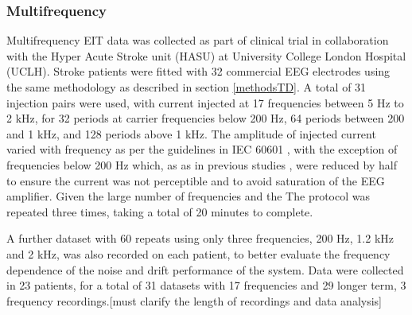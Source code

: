\subsubsection{Multifrequency}

Multifrequency EIT data was collected as part of clinical trial in collaboration with the Hyper Acute Stroke unit (HASU) at University College London Hospital (UCLH). Stroke patients were fitted with 32 commercial EEG electrodes using the same methodology as described in section \ref{methodsTD}. A total of 31 injection pairs were used, with current injected at 17 frequencies between 5 Hz to 2 kHz, for 32 periods at carrier frequencies below 200 Hz, 64 periods between 200 and 1 kHz, and 128 periods above 1 kHz. The amplitude of injected current varied with frequency as per the guidelines in IEC 60601 \cite{IEC}, with the exception of frequencies below 200 Hz which, as as in previous studies \cite{McEwan_2006}, were reduced by half to ensure the current was not perceptible and to avoid saturation of the EEG amplifier. Given the large number of frequencies and the The protocol was repeated three times, taking a total of 20 minutes to complete. 

A further dataset with 60 repeats using only three frequencies, 200 Hz, 1.2 kHz and 2 kHz, was also recorded on each patient, to better evaluate the frequency dependence of the noise and drift performance of the system. Data were collected in 23 patients, for a total of 31 datasets with 17 frequencies and 29 longer term, 3 frequency recordings.[must clarify the length of recordings and data analysis] 